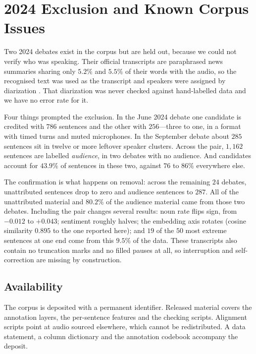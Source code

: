 \documentclass[journal]{IEEEtran}
\begin{document}
\section{2024 Exclusion and Known Corpus Issues}
\label{app:known}

Two 2024 debates exist in the corpus but are held out, because we could not
verify who was speaking. Their official transcripts are paraphrased news
summaries sharing only $5.2\%$ and $5.5\%$ of their words with the audio, so
the recognised text was used as the transcript and speakers were assigned by
diarization \cite{bredin2023pyannote}. That diarization was never checked
against hand-labelled data and we have no error rate for it.

Four things prompted the exclusion. In the June 2024 debate one candidate is
credited with $786$ sentences and the other with $256$---three to one, in a
format with timed turns and muted microphones. In the September debate about
$285$ sentences sit in twelve or more leftover speaker clusters. Across the
pair, $1{,}162$ sentences are labelled \emph{audience}, in two debates with no
audience. And candidates account for $43.9\%$ of sentences in these two,
against $76$ to $86\%$ everywhere else.

The confirmation is what happens on removal: across the remaining $24$
debates, unattributed sentences drop to zero and audience sentences to $287$.
All of the unattributed material and $80.2\%$ of the audience material came
from those two debates. Including the pair changes several results: noun
rate flips sign, from $-0.012$ to $+0.043$; sentiment roughly halves; the
embedding axis rotates (cosine similarity $0.895$ to the one reported here);
and $19$ of the $50$ most extreme sentences at one end come from this
$9.5\%$ of the data. These transcripts also contain no truncation marks and
no filled pauses at all, so interruption and self-correction are missing by
construction.

\subsection*{Availability}
The corpus is deposited with a permanent identifier. Released material covers
the annotation layers, the per-sentence features and the checking scripts.
Alignment scripts point at audio sourced elsewhere, which cannot be
redistributed. A data statement, a column dictionary and the annotation
codebook accompany the deposit.
\label{app:resource}
\end{document}
